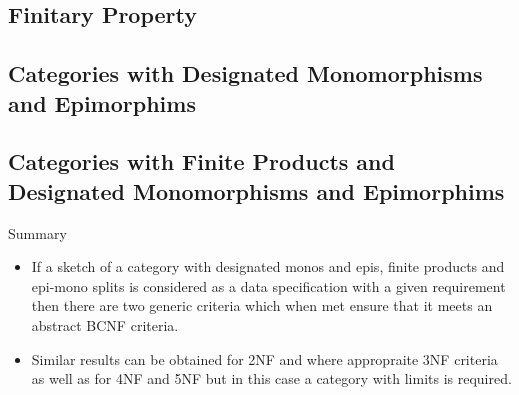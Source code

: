 \subsection{Finitary Property}


\subsection{Categories with Designated Monomorphisms and Epimorphims}


\subsection{Categories with Finite Products and Designated Monomorphisms and Epimorphims}


\begin{frame}{Summary}
\begin{itemize}
\item If a sketch of a category with designated monos and epis, finite products and epi-mono splits is
 considered as a data specification with a given requirement then there are  two generic criteria which when met
 ensure that it meets an abstract BCNF criteria.
\item Similar results can be obtained for 2NF and where appropraite 3NF criteria as well as for 4NF and 5NF but in this case a category with limits is required.
\end{itemize}
\end{frame}



\iffalse

\subsection{Entity-Relationship Notation}


\subsection{Unused}

\fi

